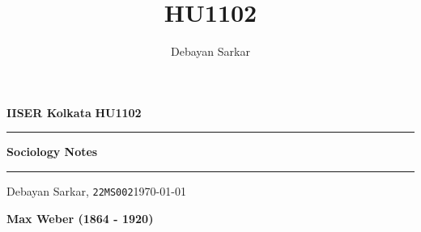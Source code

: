 \documentclass[10pt]{article}
\title{HU1102}
\author{Debayan Sarkar}
\date{}
\begin{document}
            \par\textbf{IISER Kolkata} \hfill \textbf{HU1102}
        \vspace{3pt}
        \hrule
        \vspace{3pt}
        \begin{center}
                \LARGE{\textbf{Sociology Notes}}
        \end{center}
        \vspace{3pt}
        \hrule
        \vspace{3pt}
        Debayan Sarkar, \texttt{22MS002}\hfill\today
        \vspace{20pt}
        \begin{center}
                \LARGE{\textbf{Max Weber (1864 - 1920)}}
        \end{center}
        \vspace{20pt}
\end{document}
